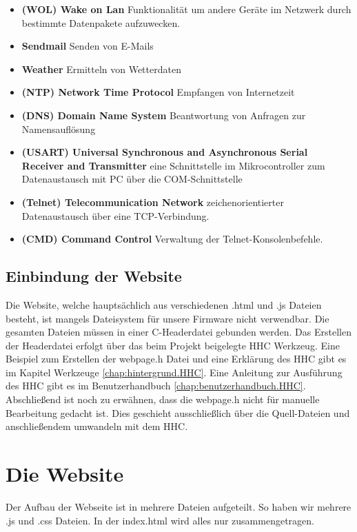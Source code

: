 \begin{itemize}
  \item \textbf{(WOL) Wake on Lan} Funktionalität um andere Geräte im Netzwerk
  durch bestimmte Datenpakete aufzuwecken.
  \item \textbf{Sendmail} Senden von E-Mails
  \item \textbf{Weather} Ermitteln von Wetterdaten
  \item \textbf{(NTP) Network Time Protocol} Empfangen von Internetzeit
  \item \textbf{(DNS) Domain Name System} Beantwortung von Anfragen zur
  Namensauflösung
  \item \textbf{(USART) Universal Synchronous and Asynchronous Serial Receiver and
  Transmitter} eine Schnittstelle im Mikrocontroller zum Datenaustausch mit PC über die COM-Schnittstelle
  \item \textbf{(Telnet) Telecommunication Network} zeichenorientierter
  Datenaustausch über eine TCP-Verbindung.
  \item \textbf{(CMD) Command Control} Verwaltung der Telnet-Konsolenbefehle.
\end{itemize}

\subsection{Einbindung der Website}

Die Website, welche hauptsächlich aus verschiedenen .html und .js Dateien
besteht, ist mangels Dateisystem für unsere Firmware nicht verwendbar. Die
gesamten Dateien müssen in einer C-Headerdatei gebunden werden.
Das Erstellen der Headerdatei erfolgt über das beim Projekt beigelegte
\ac{HHC} Werkzeug. Eine Beispiel zum Erstellen der \textrm{webpage.h} 
Datei und eine Erklärung des \ac{HHC} gibt es im Kapitel Werkzeuge
\ref{chap:hintergrund.HHC}. Eine Anleitung zur Ausführung des \ac{HHC} gibt es im
Benutzerhandbuch \ref{chap:benutzerhandbuch.HHC}.
Abschließend ist noch zu erwähnen, dass die \textrm{webpage.h} nicht für manuelle
Bearbeitung gedacht ist. Dies geschieht ausschließlich über die Quell-Dateien
und anschließendem umwandeln mit dem \ac{HHC}.

\section{Die Website}

Der Aufbau der Webseite ist in mehrere Dateien aufgeteilt. So haben wir mehrere
.js und .css Dateien. In der index.html wird alles nur zusammengetragen.


